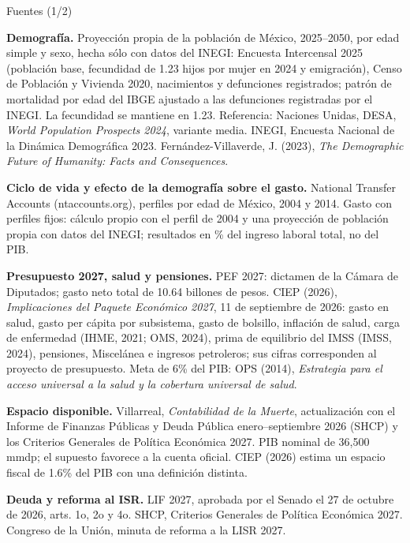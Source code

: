\documentclass[aspectratio=169,10pt]{beamer}
\begin{document}
\begin{frame}{Fuentes (1/2)}
  \vspace{0.2em}
  {\fontsize{6.6}{8.4}\selectfont\raggedright
  \textbf{Demografía.} Proyección propia de la población de México, 2025--2050, por edad simple y sexo, hecha sólo con datos del INEGI: Encuesta Intercensal 2025 (población base, fecundidad de 1.23 hijos por mujer en 2024 y emigración), Censo de Población y Vivienda 2020, nacimientos y defunciones registrados; patrón de mortalidad por edad del IBGE ajustado a las defunciones registradas por el INEGI. La fecundidad se mantiene en 1.23. Referencia: Naciones Unidas, DESA, \emph{World Population Prospects 2024}, variante media. INEGI, Encuesta Nacional de la Dinámica Demográfica 2023. Fernández-Villaverde, J. (2023), \emph{The Demographic Future of Humanity: Facts and Consequences}.\par\vspace{0.6em}
  \textbf{Ciclo de vida y efecto de la demografía sobre el gasto.} National Transfer Accounts (ntaccounts.org), perfiles por edad de México, 2004 y 2014. Gasto con perfiles fijos: cálculo propio con el perfil de 2004 y una proyección de población propia con datos del INEGI; resultados en \% del ingreso laboral total, no del PIB.\par\vspace{0.6em}
  \textbf{Presupuesto 2027, salud y pensiones.} PEF 2027: dictamen de la Cámara de Diputados; gasto neto total de 10.64 billones de pesos. CIEP (2026), \emph{Implicaciones del Paquete Económico 2027}, 11 de septiembre de 2026: gasto en salud, gasto per cápita por subsistema, gasto de bolsillo, inflación de salud, carga de enfermedad (IHME, 2021; OMS, 2024), prima de equilibrio del IMSS (IMSS, 2024), pensiones, Miscelánea e ingresos petroleros; sus cifras corresponden al proyecto de presupuesto. Meta de 6\% del PIB: OPS (2014), \emph{Estrategia para el acceso universal a la salud y la cobertura universal de salud}.\par\vspace{0.6em}
  \textbf{Espacio disponible.} Villarreal, \emph{Contabilidad de la Muerte}, actualización con el Informe de Finanzas Públicas y Deuda Pública enero--septiembre 2026 (SHCP) y los Criterios Generales de Política Económica 2027. PIB nominal de 36,500 mmdp; el supuesto favorece a la cuenta oficial. CIEP (2026) estima un espacio fiscal de 1.6\% del PIB con una definición distinta.\par\vspace{0.6em}
  \textbf{Deuda y reforma al ISR.} LIF 2027, aprobada por el Senado el 27 de octubre de 2026, arts. 1o, 2o y 4o. SHCP, Criterios Generales de Política Económica 2027. Congreso de la Unión, minuta de reforma a la LISR 2027.\par}
\end{frame}
\end{document}
